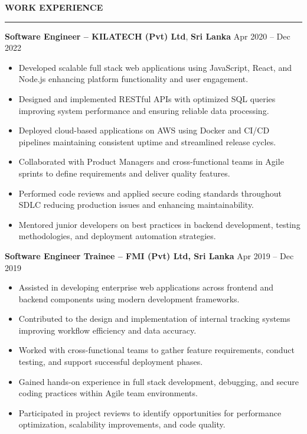 \documentclass[10pt,letterpaper]{article}
\begin{document}
\textbf{WORK EXPERIENCE}\\[-8pt]
\noindent\rule{\textwidth}{1pt}

\vspace{-2pt}

\textbf{Software Engineer -- KILATECH (Pvt) Ltd}, \textbf{Sri Lanka} \hfill Apr 2020 -- Dec 2022

\vspace{-1pt}

\begin{itemize}
\item Developed scalable full stack web applications using JavaScript, React, and Node.js enhancing platform functionality and user engagement.
\item Designed and implemented RESTful APIs with optimized SQL queries improving system performance and ensuring reliable data processing.
\item Deployed cloud-based applications on AWS using Docker and CI/CD pipelines maintaining consistent uptime and streamlined release cycles.
\item Collaborated with Product Managers and cross-functional teams in Agile sprints to define requirements and deliver quality features.
\item Performed code reviews and applied secure coding standards throughout SDLC reducing production issues and enhancing maintainability.
\item Mentored junior developers on best practices in backend development, testing methodologies, and deployment automation strategies.
\end{itemize}

\textbf{Software Engineer Trainee -- FMI (Pvt) Ltd, Sri Lanka} \hfill Apr 2019 -- Dec 2019

\vspace{-1pt}

\begin{itemize}
\item Assisted in developing enterprise web applications across frontend and backend components using modern development frameworks.
\item Contributed to the design and implementation of internal tracking systems improving workflow efficiency and data accuracy.
\item Worked with cross-functional teams to gather feature requirements, conduct testing, and support successful deployment phases.
\item Gained hands-on experience in full stack development, debugging, and secure coding practices within Agile team environments.
\item Participated in project reviews to identify opportunities for performance optimization, scalability improvements, and code quality.
\end{itemize}
\end{document}
